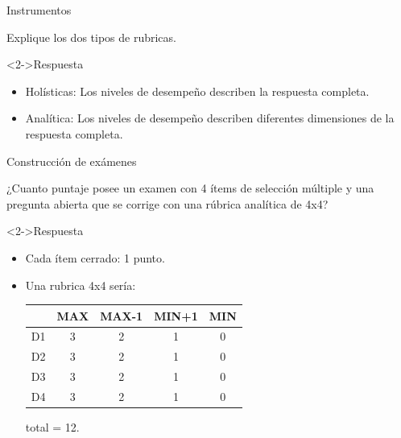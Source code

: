 \documentclass[11pt, aspectratio=169, xcolor=table,hyphens]{beamer}
\begin{document}
\begin{frame}{Instrumentos}
	\begin{center}
		Explique los dos tipos de rubricas.
	\end{center}
	\begin{block}<2->{Respuesta}
		\begin{itemize}[<2->]
			\item Holísticas: Los niveles de desempeño describen la respuesta completa.
			\item Analítica: Los niveles de desempeño describen diferentes dimensiones de la respuesta completa.
		\end{itemize}
		\begin{flushright}
			\cite{CRAIG2000}
		\end{flushright}
	\end{block}

\end{frame}

\begin{frame}{Construcción de exámenes}
	\begin{center}
		¿Cuanto puntaje posee un examen con 4 ítems de selección múltiple y una pregunta abierta que se corrige con una rúbrica analítica de 4x4?
	\end{center}
	\begin{block}<2->{Respuesta}
		\begin{itemize}[<2->]
			\item Cada ítem cerrado: 1 punto.
			\item Una rubrica 4x4 sería:
			      \begin{tabular}{|c|c|c|c|c|}
				      \hline
				         & MAX & MAX-1 & MIN+1 & MIN \\
				      \hline
				      D1 & 3   & 2     & 1     & 0   \\
				      \hline
				      D2 & 3   & 2     & 1     & 0   \\
				      \hline
				      D3 & 3   & 2     & 1     & 0   \\
				      \hline
				      D4 & 3   & 2     & 1     & 0   \\
				      \hline
			      \end{tabular}
			      total = 12.
		\end{itemize}
		\begin{flushright}
			\cite{MIDE2021}
		\end{flushright}
	\end{block}
\end{frame}
\end{document}
